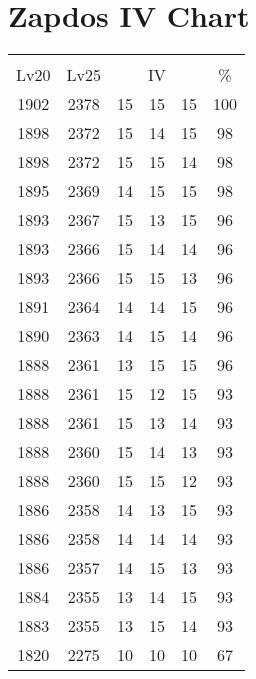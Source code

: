 \documentclass{article}%
\begin{document}
%
\normalsize%
\section{Zapdos IV Chart}%
\label{sec:Zapdos IV Chart}%
\renewcommand{\arraystretch}{1.5}%
\begin{tabular}{|c|c|c|c|c|c|}%
\hline%
\multicolumn{6}{|c|}{\textcolor{white}{ 
\linebreak{Zapdos}
}%
\cellcolor{black}}\\%
\multicolumn{1}{|c}{Lv20}&\multicolumn{1}{c|}{Lv25}&\multicolumn{3}{c|}{IV}&\multicolumn{1}{|c|}{\%}\\%
\hline%
\rowcolor{color100}%
1902&2378&15&15&15&100\\%
\hline%
\rowcolor{color98}%
1898&2372&15&14&15&98\\%
\hline%
\rowcolor{color98}%
1898&2372&15&15&14&98\\%
\hline%
\rowcolor{color98}%
1895&2369&14&15&15&98\\%
\hline%
\rowcolor{color96}%
1893&2367&15&13&15&96\\%
\hline%
\rowcolor{color96}%
1893&2366&15&14&14&96\\%
\hline%
\rowcolor{color96}%
1893&2366&15&15&13&96\\%
\hline%
\rowcolor{color96}%
1891&2364&14&14&15&96\\%
\hline%
\rowcolor{color96}%
1890&2363&14&15&14&96\\%
\hline%
\rowcolor{color96}%
1888&2361&13&15&15&96\\%
\hline%
\rowcolor{color93}%
1888&2361&15&12&15&93\\%
\hline%
\rowcolor{color93}%
1888&2361&15&13&14&93\\%
\hline%
\rowcolor{color93}%
1888&2360&15&14&13&93\\%
\hline%
\rowcolor{color93}%
1888&2360&15&15&12&93\\%
\hline%
\rowcolor{color93}%
1886&2358&14&13&15&93\\%
\hline%
\rowcolor{color93}%
1886&2358&14&14&14&93\\%
\hline%
\rowcolor{color93}%
1886&2357&14&15&13&93\\%
\hline%
\rowcolor{color93}%
1884&2355&13&14&15&93\\%
\hline%
\rowcolor{color93}%
1883&2355&13&15&14&93\\%
\hline%
\rowcolor{color91}%
1820&2275&10&10&10&67\\%
\end{tabular}

%
\end{document}
